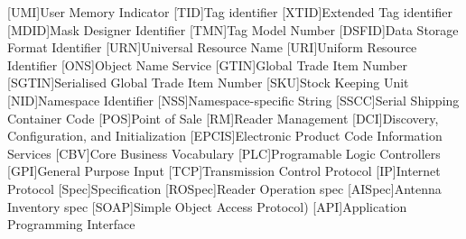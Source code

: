 \begin{multicols}{2}
\begin{acronym}[AAAAAA]
	[UMI]{User Memory Indicator}
	[TID]{Tag identifier}
	[XTID]{Extended Tag identifier}
	[MDID]{Mask Designer Identifier}
	[TMN]{Tag Model Number}
	[DSFID]{Data Storage Format Identifier}
	[URN]{Universal Resource Name}
	[URI]{Uniform Resource Identifier}
	[ONS]{Object Name Service}
	[GTIN]{Global Trade Item Number}
	[SGTIN]{Serialised Global Trade Item Number}
	[SKU]{Stock Keeping Unit}
	[NID]{Namespace Identifier}
	[NSS]{Namespace-specific String}
	[SSCC]{Serial Shipping Container Code}
	[POS]{Point of Sale}
	[RM]{Reader Management}
	[DCI]{Discovery, Configuration, and 
	Initialization}
	[EPCIS]{Electronic Product Code Information Services}
	[CBV]{Core Business Vocabulary}
	[PLC]{Programable Logic Controllers}
	[GPI]{General Purpose Input}
	[TCP]{Transmission Control Protocol}
	[IP]{Internet Protocol}
	[Spec]{Specification}
	[ROSpec]{Reader Operation \acs{spec}}
	[AISpec]{Antenna Inventory \acs{spec}}
	[SOAP]{Simple Object Access Protocol)}
	[API]{Application Programming Interface}
\end{acronym}
\end{multicols}

